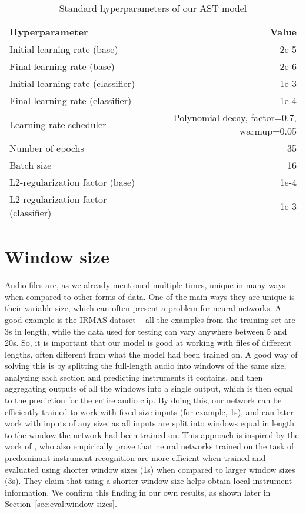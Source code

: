 \begin{table}[H]
\centering
\begin{tabular}{l r}
Hyperparameter           & Value   \\ \hline
Initial learning rate (base)    & 2e-5                        \\
Final learning rate (base)     & 2e-6                        \\
Initial learning rate (classifier)    & 1e-3                        \\
Final learning rate (classifier)     & 1e-4                        \\
Learning rate scheduler  & Polynomial decay, factor=0.7, warmup=0.05 \\
Number of epochs         & 35                          \\
Batch size               & 16                          \\
L2-regularization factor (base) & 1e-4                  \\
L2-regularization factor (classifier) & 1e-3                  
\end{tabular}
\caption{Standard hyperparameters of our AST model}
\label{tab:ast-hyperparams}
\end{table}

\section{Window size}
\label{sec:window-size}
Audio files are, as we already mentioned multiple times, unique in many ways when compared to other forms of data. One of the main ways they are unique is their variable size, which can often present a problem for neural networks. A good example is the IRMAS dataset -- all the examples from the training set are 3s in length, while the data used for testing can vary anywhere between 5 and 20s. So, it is important that our model is good at working with files of different lengths, often different from what the model had been trained on. A good way of solving this is by splitting the full-length audio into windows of the same size, analyzing each section and predicting instruments it contains, and then aggregating outputs of all the windows into a single output, which is then equal to the prediction for the entire audio clip. By doing this, our network can be efficiently trained to work with fixed-size inputs (for example, 1s), and can later work with inputs of any size, as all inputs are split into windows equal in length to the window the network had been trained on. This approach is inspired by the work of \cite{hanetal_2016}, who also empirically prove that neural networks trained on the task of predominant instrument recognition are more efficient when trained and evaluated using shorter window sizes (1s) when compared to larger window sizes (3s). They claim that using a shorter window size helps obtain local instrument information. We confirm this finding in our own results, as shown later in Section~\ref{sec:eval:window-sizes}.

